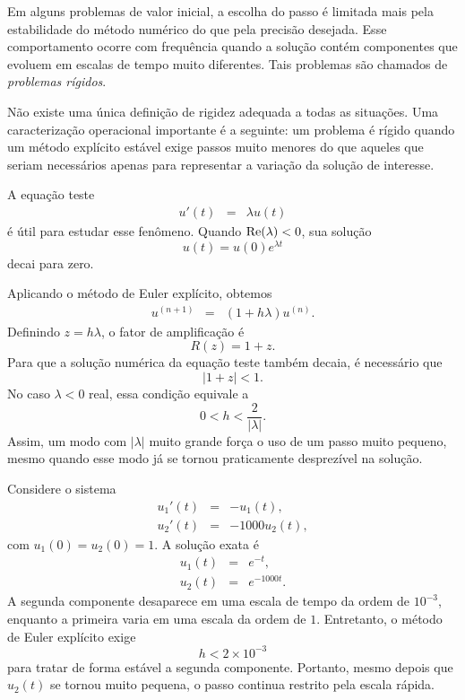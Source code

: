 Em alguns problemas de valor inicial, a escolha do passo é limitada mais pela estabilidade do método numérico do que pela precisão desejada. Esse comportamento ocorre com frequência quando a solução contém componentes que evoluem em escalas de tempo muito diferentes. Tais problemas são chamados de \emph{problemas rígidos}.

Não existe uma única definição de rigidez adequada a todas as situações. Uma caracterização operacional importante é a seguinte: um problema é rígido quando um método explícito estável exige passos muito menores do que aqueles que seriam necessários apenas para representar a variação da solução de interesse.

A equação teste
\begin{eqnarray}\label{eq:teste_estabilidade}
u'(t)&=&\lambda u(t)
\end{eqnarray}
é útil para estudar esse fenômeno. Quando $\mathop{\rm Re}(\lambda)<0$, sua solução
\begin{equation}
u(t)=u(0)e^{\lambda t}
\end{equation}
decai para zero.

Aplicando o método de Euler explícito, obtemos
\begin{eqnarray}
u^{(n+1)}&=&(1+h\lambda)u^{(n)}.
\end{eqnarray}
Definindo $z=h\lambda$, o fator de amplificação é
\begin{equation}
R(z)=1+z.
\end{equation}
Para que a solução numérica da equação teste também decaia, é necessário que
\begin{equation}
|1+z|<1.
\end{equation}
No caso $\lambda<0$ real, essa condição equivale a
\begin{equation}
0<h<\frac{2}{|\lambda|}.
\end{equation}
Assim, um modo com $|\lambda|$ muito grande força o uso de um passo muito pequeno, mesmo quando esse modo já se tornou praticamente desprezível na solução.

\begin{ex}
Considere o sistema
\begin{eqnarray}
u_1'(t)&=&-u_1(t),\\
u_2'(t)&=&-1000u_2(t),
\end{eqnarray}
com $u_1(0)=u_2(0)=1$. A solução exata é
\begin{eqnarray}
u_1(t)&=&e^{-t},\\
u_2(t)&=&e^{-1000t}.
\end{eqnarray}
A segunda componente desaparece em uma escala de tempo da ordem de $10^{-3}$, enquanto a primeira varia em uma escala da ordem de $1$. Entretanto, o método de Euler explícito exige
\begin{equation}
h<2\times 10^{-3}
\end{equation}
para tratar de forma estável a segunda componente. Portanto, mesmo depois que $u_2(t)$ se tornou muito pequena, o passo continua restrito pela escala rápida.
\end{ex}


